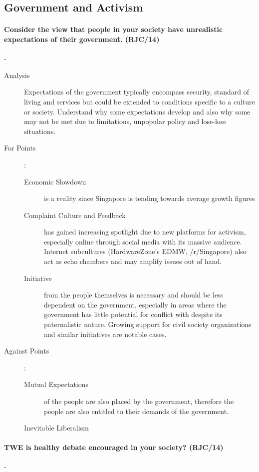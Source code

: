 \documentclass[../../main]{subfiles}
\begin{document}
\subsection{Government and Activism}

\paragraph{Consider the view that people in your society have unrealistic expectations of their government. (RJC/14)}-

\begin{description}
	\item[Analysis] Expectations of the government typically encompass security, standard of living and services but could be extended to conditions specific to a culture or society. Understand why some expectations develop and also why some may not be met due to limitations, unpopular policy and lose-lose situations.
	\item[For Points] :
		\begin{description}
			\item[Economic Slowdown] is a reality since Singapore is tending towards average growth figures 
			\item[Complaint Culture and Feedback] has gained increasing spotlight due to new platforms for activism, especially online through social media with its massive audience. Internet subcultures (HardwareZone's EDMW, /r/Singapore) also act as echo chambers and may amplify issues out of hand.
			\item[Initiative] from the people themselves is necessary and should be less dependent on the government, especially in areas where the government has little potential for conflict with despite its paternalistic nature. Growing support for civil society organizations and similar initiatives are notable cases.
		\end{description}
	\item[Against Points] :
		\begin{description}
			\item[Mutual Expectations] of the people are also placed by the government, therefore the people are also entitled to their demands of the government.
			\item[Inevitable Liberalism]
		\end{description}
\end{description}

\paragraph{TWE is healthy debate encouraged in your society? (RJC/14)}-
\end{document}

